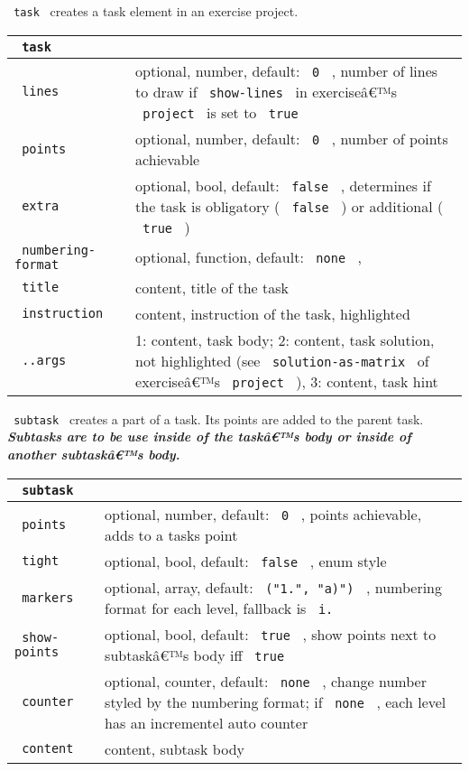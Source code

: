 \texttt{\ task\ } creates a task element in an exercise project.

\begin{longtable}[]{@{}ll@{}}
\toprule\noalign{}
\texttt{\ task\ } & \\
\midrule\noalign{}
\endhead
\bottomrule\noalign{}
\endlastfoot
\texttt{\ lines\ } & optional, number, default: \texttt{\ 0\ } , number
of lines to draw if \texttt{\ show-lines\ } in exerciseâ€™s
\texttt{\ project\ } is set to \texttt{\ true\ } \\
\texttt{\ points\ } & optional, number, default: \texttt{\ 0\ } , number
of points achievable \\
\texttt{\ extra\ } & optional, bool, default: \texttt{\ false\ } ,
determines if the task is obligatory ( \texttt{\ false\ } ) or
additional ( \texttt{\ true\ } ) \\
\texttt{\ numbering-format\ } & optional, function, default:
\texttt{\ none\ } , \\
\texttt{\ title\ } & content, title of the task \\
\texttt{\ instruction\ } & content, instruction of the task,
highlighted \\
\texttt{\ ..args\ } & 1: content, task body; 2: content, task solution,
not highlighted (see \texttt{\ solution-as-matrix\ } of exerciseâ€™s
\texttt{\ project\ } ), 3: content, task hint \\
\end{longtable}

\texttt{\ subtask\ } creates a part of a task. Its points are added to
the parent task. \emph{\textbf{Subtasks are to be use inside of the
taskâ€™s body or inside of another subtaskâ€™s body.}}

\begin{longtable}[]{@{}ll@{}}
\toprule\noalign{}
\texttt{\ subtask\ } & \\
\midrule\noalign{}
\endhead
\bottomrule\noalign{}
\endlastfoot
\texttt{\ points\ } & optional, number, default: \texttt{\ 0\ } , points
achievable, adds to a tasks point \\
\texttt{\ tight\ } & optional, bool, default: \texttt{\ false\ } , enum
style \\
\texttt{\ markers\ } & optional, array, default:
\texttt{\ ("1.",\ "a)")\ } , numbering format for each level, fallback
is \texttt{\ i.\ } \\
\texttt{\ show-points\ } & optional, bool, default: \texttt{\ true\ } ,
show points next to subtaskâ€™s body iff \texttt{\ true\ } \\
\texttt{\ counter\ } & optional, counter, default: \texttt{\ none\ } ,
change number styled by the numbering format; if \texttt{\ none\ } ,
each level has an incrementel auto counter \\
\texttt{\ content\ } & content, subtask body \\
\end{longtable}

